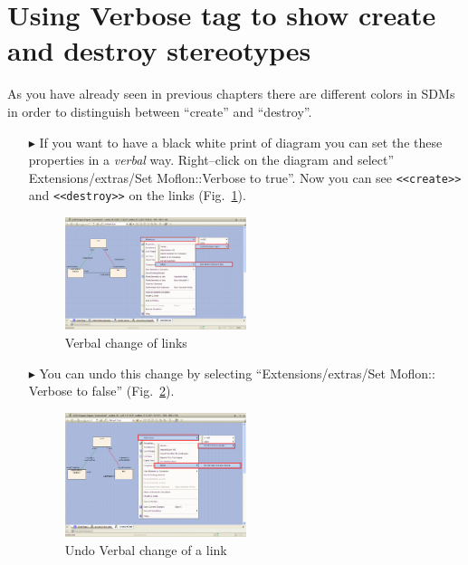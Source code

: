 \section{Using Verbose tag to show create and destroy stereotypes} As you have already seen in previous chapters there are different colors in SDMs in 
order to distinguish between ``create'' and ``destroy''.

\begin{enumerate}
\item[$\blacktriangleright$]If you want to have a black white print of diagram 
you can set the these properties in a \emph{verbal} way. Right–click on the
diagram and select'' Extensions/extras/Set Moflon::Verbose to
true''. Now you can see \texttt{<<create>>} and \texttt{<<destroy>>} on the
links (Fig.~\ref{fig_usingVerbose01}).

\begin{figure}[htbp]
\begin{center}
  \includegraphics[width=0.5\textwidth]{pics/tricks/usingVerbose/usingVerbose1}
  \caption{Verbal change of links}  
  \label{fig_usingVerbose01}
\end{center}
\end{figure}


\item[$\blacktriangleright$]You can undo this change by selecting
``Extensions/extras/Set Moflon:: Verbose to
false'' (Fig.~\ref{fig_usingVerbose02}).

 \begin{figure}[htbp]
\begin{center}
  \includegraphics[width=0.5\textwidth]{pics/tricks/usingVerbose/usingVerbose2}
  \caption{Undo Verbal change of a link}  
  \label{fig_usingVerbose02}
\end{center}
\end{figure}

\end{enumerate}



